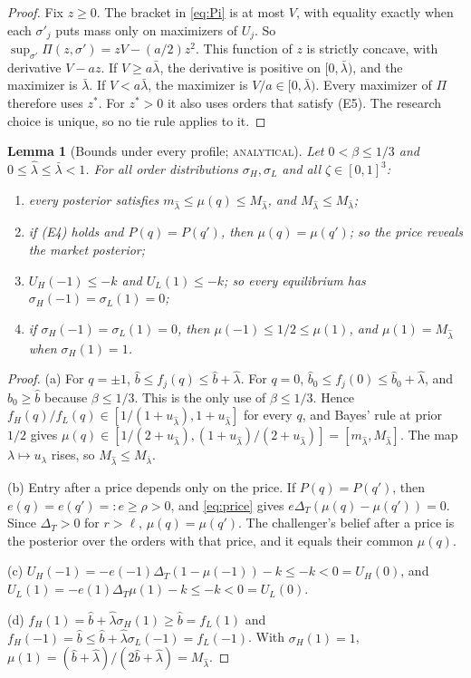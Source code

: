 \documentclass[12pt]{article}
\newtheorem{lemma}{Lemma}
\theoremstyle{definition}
\theoremstyle{remark}
\newcommand{\DT}{\Delta_T}
\newcommand{\lh}{\hat\lambda}
\newcommand{\lb}{\bar\lambda}
\newcommand{\st}[1]{\textsc{#1}}
\begin{document}
\begin{proof}
Fix $z\ge0$. The bracket in \eqref{eq:Pi} is at most $V$, with equality exactly when each $\sigma'_j$ puts mass
only on maximizers of $U_j$. So $\sup_{\sigma'}\Pi(z,\sigma')=zV-(a/2)z^2$. This function of $z$ is strictly
concave, with derivative $V-az$. If $V\ge a\lb$, the derivative is positive on $[0,\lb)$, and the maximizer is
$\lb$. If $V<a\lb$, the maximizer is $V/a\in[0,\lb)$. Every maximizer of $\Pi$ therefore uses $z^*$. For $z^*>0$
it also uses orders that satisfy (E5). The research choice is unique, so no tie rule applies to it.
\end{proof}

\begin{lemma}[Bounds under every profile; \st{analytical}]\label{lem:bounds}
Let $0<\beta\le1/3$ and $0\le\lh\le\lb<1$. For all order distributions $\sigma_H,\sigma_L$ and all
$\zeta\in[0,1]^3$:
\begin{enumerate}[label=(\alph*),nosep]
\item every posterior satisfies $m_{\lh}\le\mu(q)\le M_{\lh}$, and $M_{\lh}\le M_{\lb}$;
\item if (E4) holds and $P(q)=P(q')$, then $\mu(q)=\mu(q')$; so the price reveals the market posterior;
\item $U_H(-1)\le-k$ and $U_L(1)\le-k$; so every equilibrium has $\sigma_H(-1)=\sigma_L(1)=0$;
\item if $\sigma_H(-1)=\sigma_L(1)=0$, then $\mu(-1)\le1/2\le\mu(1)$, and $\mu(1)=M_{\lh}$ when $\sigma_H(1)=1$.
\end{enumerate}
\end{lemma}

\begin{proof}
(a) For $q=\pm1$, $\hat b\le f_j(q)\le\hat b+\lh$. For $q=0$, $\hat b_0\le f_j(0)\le\hat b_0+\lh$, and
$\hat b_0\ge\hat b$ because $\beta\le1/3$. This is the only use of $\beta\le1/3$. Hence
$f_H(q)/f_L(q)\in[1/(1+u_{\lh}),1+u_{\lh}]$ for every $q$, and Bayes' rule at prior $1/2$ gives
$\mu(q)\in[1/(2+u_{\lh}),(1+u_{\lh})/(2+u_{\lh})]=[m_{\lh},M_{\lh}]$. The map $\lambda\mapsto u_\lambda$ rises,
so $M_{\lh}\le M_{\lb}$.

(b) Entry after a price depends only on the price. If $P(q)=P(q')$, then $e(q)=e(q')=:e\ge\rho>0$, and
\eqref{eq:price} gives $e\DT(\mu(q)-\mu(q'))=0$. Since $\DT>0$ for $r>\ell$, $\mu(q)=\mu(q')$. The challenger's
belief after a price is the posterior over the orders with that price, and it equals their common $\mu(q)$.

(c) $U_H(-1)=-e(-1)\DT(1-\mu(-1))-k\le-k<0=U_H(0)$, and $U_L(1)=-e(1)\DT\mu(1)-k\le-k<0=U_L(0)$.

(d) $f_H(1)=\hat b+\lh\sigma_H(1)\ge\hat b=f_L(1)$ and $f_H(-1)=\hat b\le\hat b+\lh\sigma_L(-1)=f_L(-1)$.
With $\sigma_H(1)=1$, $\mu(1)=(\hat b+\lh)/(2\hat b+\lh)=M_{\lh}$.
\end{proof}
\end{document}
